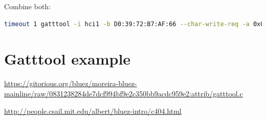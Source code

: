 \documentclass[a4paper,10pt]{article}
\newcommand{\link}[1] {\href{#1}{#1}}
\begin{document}
Combine both:
\begin{lstlisting}[language=bash]
timeout 1 gatttool -i hci1 -b D0:39:72:B7:AF:66 --char-write-req -a 0x0013 -n 14 --listen | grep -m 1 "value:"
\end{lstlisting}


\section{Gatttool example}
\link{https://gitorious.org/bluez/moreira-bluez-mainline/raw/0831238284de7dcf994bf9e2c350bb9acdc959e2:attrib/gatttool.c} 

\link{http://people.csail.mit.edu/albert/bluez-intro/c404.html}
\end{document}
